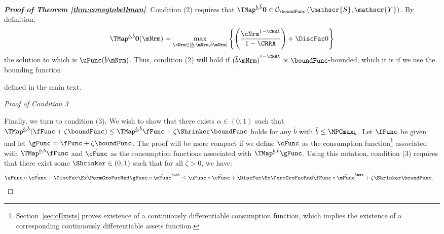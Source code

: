 \documentclass[\econtexRoot/BufferStockTheory]{subfiles}
\begin{document}
\begin{proof}[\textbf{Proof of Theorem \ref{thm:convgtobellman}}]
Condition (2) requires that $\TMap^{\underline{b}, \bar{b}}\mathbf{0}\in \mathcal{C}_{\boundFunc}\left(\mathscr{S},\mathscr{Y}\right)$. By definition,
\begin{equation*}
  \TMap^{\underline{b}, \bar{b}} \mathbf{0}(\mNrm) = \max_{\cNrm \in
    [\underline{b}, \mNrm, \bar{b} \mNrm]
  }\left\{ \left( \frac{\cNrm^{1-\CRRA }}{1-\CRRA }\right) +\DiscFac 0\right\}
\end{equation*}
the solution to which is
$\uFunc(\bar{b} \mNrm)$. Thus, condition (2)
will hold if ${(\bar{b} \mNrm)}^{1-\CRRA}$ is $\boundFunc$-bounded, which it is if we use the
bounding function

defined in the main text.


\vspace{0.7em} %
\noindent\textit{Proof of Condition 3}  %
\vspace{0.7em} %


Finally, we turn to condition (3). We wish to show that there exists $\alpha \in (0,1)$ such that $\TMap^{\underline{b}, \bar{b}}(\fFunc +\zeta\boundFunc
) \leq \TMap^{\underline{b}, \bar{b}}{\fFunc} +\zeta \Shrinker
\boundFunc$ holds for any $\bar{b}$ with $\bar{b}\leq \MPCmax_{k}$. Let $\fFunc$ be given and let $\gFunc = \fFunc +  \zeta
\boundFunc$. The proof will be more compact if we define
$\bar{\cFunc}$ as the consumption function\footnote{Section~\ref{sec:cExists} proves existence of a
  continuously differentiable consumption function, which implies the
  existence of a corresponding continuously differentiable assets
  function.}  associated with $\TMap^{\underline{b}, \bar{b}} \fFunc$ and $\hat{\cFunc}$ as the consumption functions associated with $\TMap^{\underline{b}, \bar{b}} \gFunc$. Using this notation, condition (3) requires that there exist some $\Shrinker\in (0,1)$ such that for all $ \zeta >0$, we have:
%
%
\begin{align*}
  \uFunc\circ \hat{\cFunc} +\DiscFac \Ex \PermGroFacRnd \gFunc\circ\hat{\mFunc}^{\nxt} & \leq  \uFunc\circ \bar{\cFunc} +\DiscFac \Ex \PermGroFacRnd \fFunc\circ\bar{\mFunc}^{\nxt}  + \zeta \Shrinker \boundFunc.
\end{align*}


\end{proof}
\end{document}
